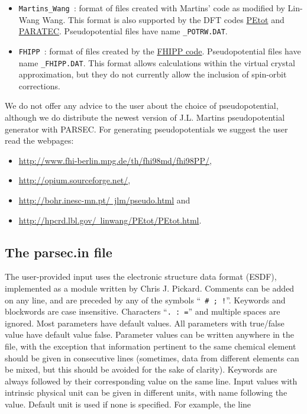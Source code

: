 \documentclass{article}
\begin{document}
\begin{itemize}
\begin{itemize}
\item {\tt Martins\_Wang }: format of files created with Martins' code
  as modified by Lin-Wang Wang. This format is also supported by the
  DFT codes \href{http://hpcrd.lbl.gov/~linwang/PEtot/PEtot.html}{PEtot} and
  \href{http://www.nersc.gov/projects/paratec/}{PARATEC}. Pseudopotential files have
  name {\tt *\_POTRW.DAT}.

\item {\tt FHIPP }: format of files created by the
  \href{http://www.fhi-berlin.mpg.de/th/fhi98md/fhi98PP/}{FHIPP code}. Pseudopotential
  files have name {\tt *\_FHIPP.DAT}. This format allows calculations
  within the virtual crystal approximation, but they do not currently
  allow the inclusion of spin-orbit corrections.
\end{itemize}

\end{itemize}

We do not offer any advice to the user about the choice of
pseudopotential, although we do distribute the newest version of
J.L. Martins pseudopotential generator with PARSEC. For generating
pseudopotentials we suggest the user read the webpages:

\begin{itemize}

\item \href{http://www.fhi-berlin.mpg.de/th/fhi98md/fhi98PP/}{http://www.fhi-berlin.mpg.de/th/fhi98md/fhi98PP/},
\item \href{http://opium.sourceforge.net/}{http://opium.sourceforge.net/},
\item \href{http://bohr.inesc-mn.pt/~jlm/pseudo.html}{http://bohr.inesc-mn.pt/~jlm/pseudo.html} and
\item \href{http://hpcrd.lbl.gov/~linwang/PEtot/PEtot.html}{http://hpcrd.lbl.gov/~linwang/PEtot/PEtot.html}.
\end{itemize}



\subsection{The parsec.in file}

The user-provided input uses the electronic structure data format 
(ESDF), implemented as a module written by Chris J. Pickard. Comments 
can be added on any line, and are preceded by any of the symbols ``{\tt 
\# ; !}''. Keywords and blockwords are case insensitive. Characters 
``{\tt . : =}'' and multiple spaces are ignored. Most parameters have 
default values. All parameters with true/false value have default value 
false. Parameter values can be written anywhere in the file, with the 
exception that information pertinent to the same chemical element should 
be given in consecutive lines (sometimes, data from different elements 
can be mixed, but this should be avoided for the sake of clarity). 
Keywords are always followed by their corresponding value on the same 
line. Input values with intrinsic physical unit can be given in 
different units, with name following the value. Default unit is used if 
none is specified. For example, the line
\end{document}

